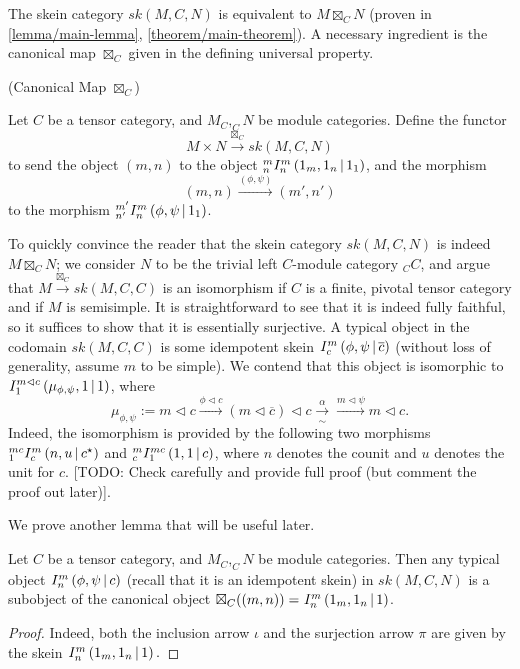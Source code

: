\noindent The skein category $sk(M,C,N)$ is equivalent to $M \boxtimes_{C} N$ (proven
in \ref{lemma/main-lemma}, \ref{theorem/main-theorem}). A necessary ingredient
is the canonical map $\boxtimes_{C}$ given in the defining universal property.

\begin{definition}\label{definition/canonical-map} (Canonical Map $\boxtimes_{C}$)

  \noindent Let $C$ be a tensor category, and $M_{C}, _{C}N$ be module categories. Define the functor
  \[
    M \times N \xrightarrow{\boxtimes_{C}} sk(M,C,N)
  \]
  to send the object $(m,n)$ to the object ${}^{m}_{n} I^{m}_{n} \left( 1_{m}, 1_{n} \,\middle|\, 1_{1} \right)$, and the morphism
  \[
    (m,n) \xrightarrow{(\phi, \psi)} (m', n')
  \]
  to the morphism ${}^{m'}_{n'} I^{m}_{n} \left( \phi, \psi \,\middle|\, 1_{1} \right)$.
\end{definition}


\noindent To quickly convince the reader that the skein category $sk(M,C,N)$
is indeed $M \boxtimes_{C} N$; we consider $N$ to be the trivial left
$C$-module category $_{C}C$, and argue that
$M \xrightarrow{\boxtimes_{C}} sk(M,C,C)$ is an isomorphism if $C$ is a
finite, pivotal tensor category and if $M$ is semisimple. It is
straightforward to see that it is indeed fully faithful, so it suffices to
show that it is essentially surjective. A typical object in the codomain
$sk(M,C,C)$ is some idempotent skein ${}^{}_{} I^{m}_{c} \left( \phi, \psi \,\middle|\, \overline{c} \right)$
(without loss of generality, assume $m$ to be simple). We contend that this
object is isomorphic to ${}^{}_{} I^{m \lhd c}_{1} \left( \mu_{\phi, \psi}, 1 \,\middle|\, 1 \right)$, where
\[
  \mu_{\phi,\psi} := m \lhd c \xrightarrow{\phi \lhd c} (m \lhd \overline{c}) \lhd c \xrightarrow[\sim]{\alpha} \xrightarrow{m \lhd \psi} m \lhd c.
\]
Indeed, the isomorphism is provided by the following two morphisms
${}^{mc}_{1} I^{m}_{c} \left( n, u \,\middle|\, c^{\star} \right)$ and ${}^{m}_{c} I^{mc}_{1} \left( 1, 1 \,\middle|\, c \right)$, where $n$
denotes the counit and $u$ denotes the unit for $c$. [TODO: Check carefully
and provide full proof (but comment the proof out later)].

\hfill\break
\noindent We prove another lemma that will be useful later.

\begin{lemma}\label{lemma/I-provides-subobject}

  \noindent Let $C$ be a tensor category, and $M_{C}, _{C}N$ be module
  categories. Then any typical object ${}^{}_{} I^{m}_{n} \left( \phi, \psi \,\middle|\, c \right)$ (recall
  that it is an idempotent skein) in $sk(M,C,N)$ is a subobject of the
  canonical object $\boxtimes_{C}((m,n)) = {}^{}_{} I^{m}_{n} \left( 1_{m}, 1_{n} \,\middle|\, 1 \right)$.
\end{lemma}
\begin{proof}
  Indeed, both the inclusion arrow $\iota$ and the surjection arrow $\pi$ are
  given by the skein ${}^{}_{} I^{m}_{n} \left( 1_{m}, 1_{n} \,\middle|\, 1 \right).$
\end{proof}

